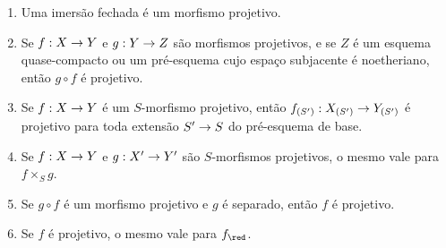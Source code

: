 \documentclass[oneside,10pt]{amsart}
\makeatletter
\newcommand{\ega@arrow}[2]{\mathchoice{#1}{#2}{#2}{#2}}
\renewcommand{\to}{\ega@arrow{\longrightarrow}{\rightarrow}}
\let\EGAOriginalLabel\label
\renewcommand{\label}[1]{\phantomsection\EGAOriginalLabel{#1}}
\makeatother
\begin{document}
\begin{proposition}[5.5.5]
\label{II.5.5.5}
\medskip\noindent
\begin{enumerate}
  \item[\rm{(i)}] Uma imersão fechada é um morfismo projetivo.
  \item[\rm{(ii)}] Se $f:X\to Y$ e $g:Y\to Z$ são morfismos projetivos, e se $Z$ é um esquema quase-compacto ou um pré-esquema cujo espaço subjacente é noetheriano, então $g\circ f$ é projetivo.
  \item[\rm{(iii)}] Se $f:X\to Y$ é um $S$-morfismo projetivo, então $f_{(S')}:X_{(S')}\to Y_{(S')}$ é projetivo para toda extensão $S'\to S$ do pré-esquema de base.
  \item[\rm{(iv)}] Se $f:X\to Y$ e $g:X'\to Y'$ são $S$-morfismos projetivos, o mesmo vale para $f\times_S g$.
  \item[\rm{(v)}] Se $g\circ f$ é um morfismo projetivo e $g$ é separado, então $f$ é projetivo.
  \item[\rm{(vi)}] Se $f$ é projetivo, o mesmo vale para $f_\red$.
\end{enumerate}
\end{proposition}
\end{document}
